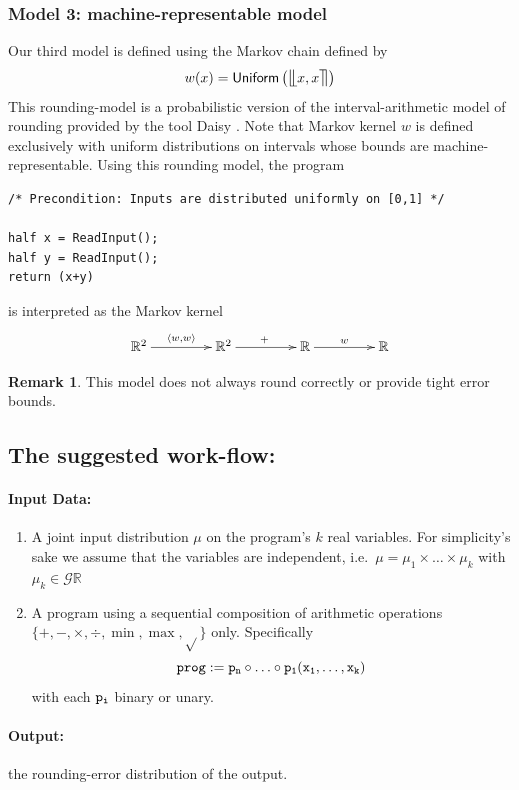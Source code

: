\documentclass[10pt,a4paper]{article}
\theoremstyle{plain}
\theoremstyle{definition}
\newtheorem{remark}[theorem]{Remark}
\newcommand{\ie}{i.e.\ }
\newcommand{\R}{\mathbb{R}}
\newcommand{\Unif}{\mathsf{Uniform}}
\newcommand{\Giry}{\mathcal{G}}
\newcommand{\ffintvl}[1][x]{\mathlarger{\llfloor}#1,#1\mathlarger{\rrceil}}
\begin{document}
\subsubsection{Model 3: machine-representable model}

Our third model is defined using the Markov chain defined by
\[
w(x)=\Unif\left(\ffintvl\right)
\]
This rounding-model is a probabilistic version of the interval-arithmetic model of rounding provided by the tool Daisy \cite{darulova2018daisy}. Note that Markov kernel $w$ is defined exclusively with uniform distributions on intervals whose bounds are machine-representable. Using this rounding model, the program 
\begin{lstlisting}
/* Precondition: Inputs are distributed uniformly on [0,1] */

half x = ReadInput();
half y = ReadInput();
return (x+y) 
\end{lstlisting}
is interpreted as the Markov kernel
\[
\xymatrix@C=10ex
{
\R^2 \ar[r]^{\langle w,w\rangle} & \R^2\ar[r]^{+} & \R\ar[r]^{w} & \R
}
\]

\begin{remark}
This model does not always round correctly or provide tight error bounds.
\end{remark}

\subsection{The suggested work-flow:}

\paragraph{Input Data:}
\begin{enumerate}
\item A joint input distribution $\mu$ on the program's $k$ real variables. For simplicity's sake we assume that the variables are independent, \ie $\mu=\mu_1\times\ldots\times \mu_k$ with $\mu_k\in\Giry\R$ 
\item A program using a sequential composition of arithmetic operations $\{+,-,\times,\div,\min,\max,\sqrt{}\}$ only. Specifically
\[
\tt{prog:=p_n\circ\ldots\circ p_1 (x_1,\ldots,x_k)}
\]
with each $\tt{p}_i$ binary or unary.
\end{enumerate} 

\paragraph{Output:} the rounding-error distribution of the output.
\end{document}

